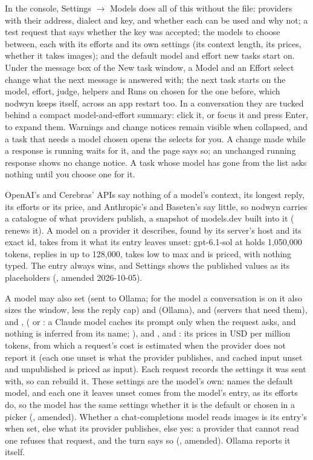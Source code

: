 In the console, Settings $\to$ Models does all of this without the file:
providers with their address, dialect and key, and whether each can be used and
why not; a test request that says whether the key was accepted; the models to
choose between, each with its efforts and its own settings (its context
length, its prices, whether it takes images); and the default model and effort
new tasks start on. Under the message box of the New task window, a Model and an
Effort select change what the next message is answered with; the next task
starts on the model, effort, judge, helpers and Runs on chosen for
the one before, which nodwyn keeps itself, across an app restart too. In a conversation
they are tucked behind a compact model-and-effort summary: click it, or focus it
and press Enter, to expand them. Warnings and change notices remain visible
when collapsed, and a task that needs a model chosen opens the selects for
you. A change made while a response is running waits for it, and the
page says so; an unchanged running response shows no change notice.
A task whose model has gone from the list asks nothing until you
choose one for it.

OpenAI's and Cerebras' APIs say nothing of a model's context, its longest
reply, its efforts or its price, and Anthropic's and Baseten's say little, so
nodwyn carries a catalogue of what providers publish, a snapshot of models.dev built into it
( renews it). A model on a provider it
describes, found by its server's host and its exact id, takes from it what its
entry leaves unset: gpt-6.1-sol at  holds 1,050,000
tokens, replies in up to 128,000, takes low to max and is priced, with nothing
typed. The entry always wins, and Settings shows the published values as its
placeholders (, amended 2026-10-05).

A model may also set  (sent to Ollama; for the model a
conversation is on it also sizes the window, less the reply cap) and
 (Ollama),
 and  (servers that need them),
 and ,  (
or : a Claude model caches its prompt only when the request asks, and
nothing is inferred from its name; ), and ,
 and : its prices in USD per
million tokens, from which a request's cost is estimated when the provider
does not report it (each one unset is what the provider publishes, and
cached input unset and unpublished is priced as input). Each request
records the settings it was sent with, so  can
rebuild it. These settings are the model's own: \code{[control]} names the
default model, and each one it leaves unset comes from the model's
 entry, as its efforts do, so the model has the same
settings whether it is the default or chosen in a picker (, amended).
Whether a chat-completions model reads images is its entry's
 when set, else what its provider publishes, else yes: a
provider that cannot read one refuses that request, and the turn says so
(, amended). Ollama reports it itself.

